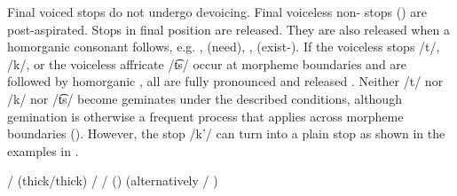 Final voiced stops do not undergo devoicing. Final voiceless non- stops () are post-aspirated. Stops in final position are released. They are also released when a homorganic consonant follows, e.g.  ,   (need),  ,  (exist-). If the voiceless stops /t/, /k/, or the voiceless affricate /t͡s/ occur at morpheme boundaries and are followed by homorganic , all  are fully pronounced and released . Neither /t/ nor /k/ nor /t͡s/ become geminates under the described conditions, although gemination is otherwise a frequent process that applies across morpheme boundaries (). However, the  stop /k’/ can turn into a plain stop as shown in the examples in .
%
\begin{exe}
	\ex	\label{ex:gemination A phon}
	\begin{xlist}
		\ex	{}\slash{}  (thick\slash{}thick)	\label{ex:bucce phon}
		\ex	{}\slash{} 	\label{ex:tuntce phon}
		\ex	{} /   () (alternatively  / )
		\label{ex:ikka phon}
	\end{xlist}
\end{exe}

